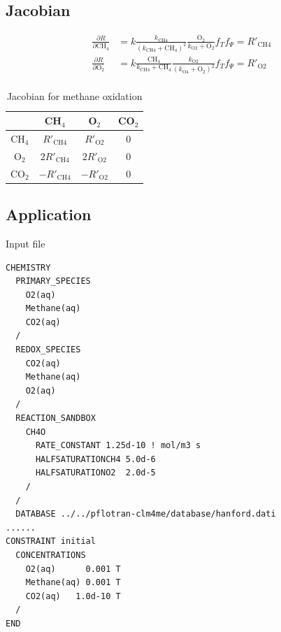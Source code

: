 \documentclass[12pt, a4paper]{article}
\begin{document}
\subsection{Jacobian}

\begin{align*}
\frac{\partial R}{\partial \text{CH}_4} &= k \frac{k_\text{CH4}}{(k_\text{CH4} + \text{CH}_4)^2} \frac{\text{O}_2}{k_\text{O2} + \text{O}_2} f_T f_\Psi = R'_\text{CH4} \\
\frac{\partial R}{\partial \text{O}_2} &= k \frac{\text{CH}_4}{k_\text{CH4} + \text{CH}_4} \frac{k_\text{O2}}{(k_\text{O4} + \text{O}_2)^2}  f_T f_\Psi = R'_\text{O2} \\
\end{align*}

\begin{table}[hb]
\centering
 \caption{Jacobian for methane oxidation} 
\begin{tabular}{ c | ccc }
                      &  CH$_4$  & O$_2$ &  CO$_2$ \\
  \hline
  CH$_4$     & $R'_\text{CH4}$ & $R'_\text{O2}$ & 0 \\
  O$_2$        & $2R'_\text{CH4}$ & $2R'_\text{O2}$ & 0 \\
  CO$_2$     & $-R'_\text{CH4}$ & $-R'_\text{O2}$ & 0 \\
\end{tabular}
\end{table}



\subsection{Application}
Input file
\begin{verbatim}
CHEMISTRY
  PRIMARY_SPECIES
    O2(aq)
    Methane(aq)
    CO2(aq)
  /
  REDOX_SPECIES
    CO2(aq)
    Methane(aq)
    O2(aq)
  /
  REACTION_SANDBOX
    CH4O
      RATE_CONSTANT 1.25d-10 ! mol/m3 s
      HALFSATURATIONCH4 5.0d-6
      HALFSATURATIONO2  2.0d-5
    /
  /
  DATABASE ../../pflotran-clm4me/database/hanford.dati
......
CONSTRAINT initial
  CONCENTRATIONS
    O2(aq)      0.001 T
    Methane(aq) 0.001 T
    CO2(aq)   1.0d-10 T
  /
END
\end{verbatim}
\end{document}
